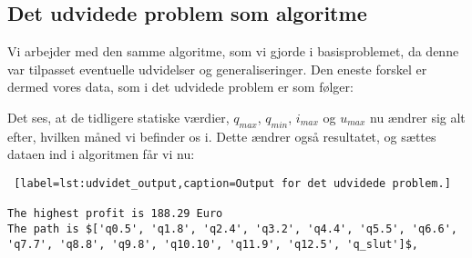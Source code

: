 \subsection{Det udvidede problem som algoritme}
Vi arbejder med den samme algoritme, som vi gjorde i basisproblemet, da denne var tilpasset eventuelle udvidelser og generaliseringer. Den eneste forskel er dermed vores data, som i det udvidede problem er som følger:

 

Det ses, at de tidligere statiske værdier, $q_{max}$, $q_{min}$, $i_{max}$ og $u_{max}$ nu ændrer sig alt efter, hvilken måned vi befinder os i. Dette ændrer også resultatet, og sættes dataen ind i algoritmen får vi nu:

\begin{lstlisting} [label=lst:udvidet_output,caption=Output for det udvidede problem.]

The highest profit is 188.29 Euro
The path is $['q0.5', 'q1.8', 'q2.4', 'q3.2', 'q4.4', 'q5.5', 'q6.6', 'q7.7', 'q8.8', 'q9.8', 'q10.10', 'q11.9', 'q12.5', 'q_slut']$,

\end{lstlisting}